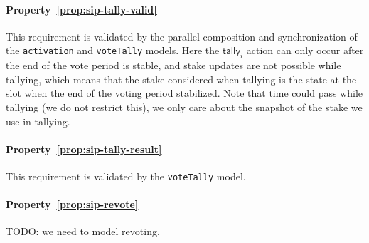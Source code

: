 \paragraph{Property~\ref{prop:sip-tally-valid}} This requirement is validated by
the parallel composition and synchronization of the \texttt{activation} and
\texttt{voteTally} models. Here the $\mathsf{tally}_i$ action can only occur
after the end of the vote period is stable, and stake updates are not possible
while tallying, which means that the stake considered when tallying is the state
at the slot when the end of the voting period stabilized. Note that time could
pass while tallying (we do not restrict this), we only care about the snapshot
of the stake we use in tallying.

\paragraph{Property~\ref{prop:sip-tally-result}} This requirement is validated
by the \texttt{voteTally} model.

\paragraph{Property~\ref{prop:sip-revote}} TODO: we need to model revoting.


